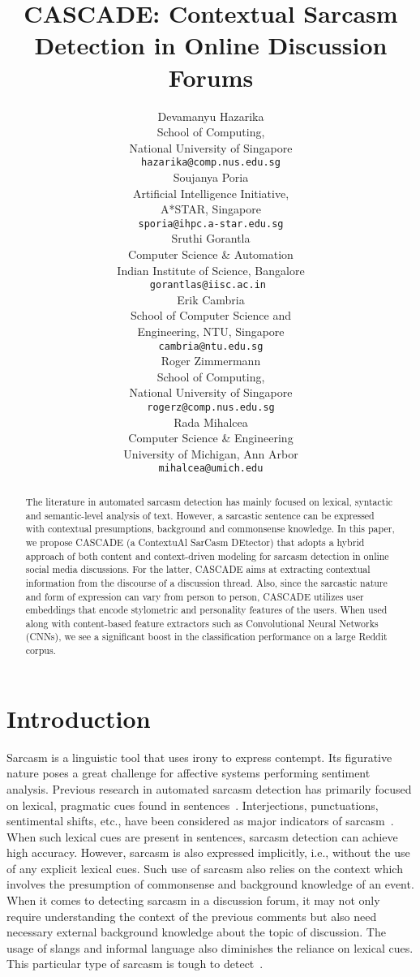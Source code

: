 \documentclass[11pt]{article}
\title{CASCADE: Contextual Sarcasm Detection in Online Discussion Forums\vspace{0.5cm}}
\author{Devamanyu Hazarika \\
  \small{School of Computing,}\\
  \small{National University of Singapore}\\
  {\footnotesize \tt hazarika@comp.nus.edu.sg} \\\And  
  Soujanya Poria \\
  \small{Artificial Intelligence Initiative,} \\
  \small{A*STAR, Singapore}\\
  {\small \tt sporia@ihpc.a-star.edu.sg} \\\And  
  Sruthi Gorantla \\
  \small{Computer Science \& Automation}\\
  \small{Indian Institute of Science, Bangalore}\\
  {\small \tt gorantlas@iisc.ac.in } \\ \AND
  Erik Cambria \\
  \small{School of Computer Science and}\\
  \small{Engineering, NTU, Singapore}\\
  {\footnotesize \tt cambria@ntu.edu.sg} \\\And  
  Roger Zimmermann \\
  \small{School of Computing,}\\
  \small{National University of Singapore}\\ 
  {\small \tt rogerz@comp.nus.edu.sg} \\ \And
  Rada Mihalcea \\
  \small{Computer Science \& Engineering}\\
  \small{University of Michigan, Ann Arbor}\\
  {\small \tt mihalcea@umich.edu} \\
}
\date{}
\begin{document}
\maketitle
\begin{abstract}
The literature in automated sarcasm detection has mainly focused on lexical, syntactic and semantic-level analysis of text. However, a sarcastic sentence can be expressed with contextual presumptions, background and commonsense knowledge. In this paper, we propose CASCADE (a ContextuAl SarCasm DEtector) that adopts a hybrid approach of both content and context-driven modeling for sarcasm detection in online social media discussions. For the latter, CASCADE aims at extracting contextual information from the discourse of a discussion thread. Also, since the sarcastic nature and form of expression can vary from person to person, CASCADE utilizes user embeddings that encode
stylometric and personality features of the users. When used along with content-based feature extractors such as Convolutional Neural Networks (CNNs), we see a significant boost in the classification performance on a large Reddit corpus.
\end{abstract}

\section{Introduction} \label{Intro}

Sarcasm is a linguistic tool that uses irony to express contempt. Its figurative nature poses a great challenge for affective systems performing sentiment analysis. Previous research in automated sarcasm detection has primarily focused on lexical, pragmatic cues found in sentences~\cite{kreuz2007lexical}. Interjections, punctuations, sentimental shifts, etc., have been considered as major indicators of sarcasm~\cite{joshi2017automatic}. When such lexical cues are present in sentences, sarcasm detection can achieve high accuracy. However, sarcasm is also expressed implicitly, i.e., without the use of any explicit lexical cues. Such use of sarcasm also relies on the context which involves the presumption of commonsense and background knowledge of an event. When it comes to detecting sarcasm in a discussion forum, it may not only require understanding the context of the previous comments but also need necessary external background knowledge about the topic of discussion.
The usage of slangs and informal language also diminishes the reliance on lexical cues. This particular type of sarcasm is tough to detect~\cite{poria2016deeper}.
\end{document}
